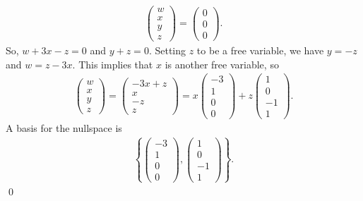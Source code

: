 \documentclass[12pt]{article}
\begin{document}
\begin{enumerate}[label=\textbf{(\alph*)}]
\begin{align*}
\begin{pmatrix}
            w\\x\\y\\z
        \end{pmatrix}=\begin{pmatrix}
            0\\0\\0
        \end{pmatrix}.
    \end{align*}
    So, $w+3x-z=0$ and $y+z=0$. Setting $z$ to be a free variable, we have $y=-z$ and $w=z-3x$. This implies that $x$ is another free variable, so \begin{align*}
        \begin{pmatrix}
            w\\x\\y\\z
        \end{pmatrix}=\begin{pmatrix}
            -3x+z \\ x\\ -z \\ z
        \end{pmatrix}=x\begin{pmatrix}
            -3 \\ 1\\ 0\\0
        \end{pmatrix}+z\begin{pmatrix}
            1\\0\\-1\\1
        \end{pmatrix}.
    \end{align*}
    A basis for the nullspace is \begin{align*}
        \left\{\begin{pmatrix}
            -3\\1\\0\\0
        \end{pmatrix},\begin{pmatrix}
            1\\0\\-1\\1
        \end{pmatrix}\right\}.
    \end{align*} \qed 
\end{enumerate}
\end{document}
